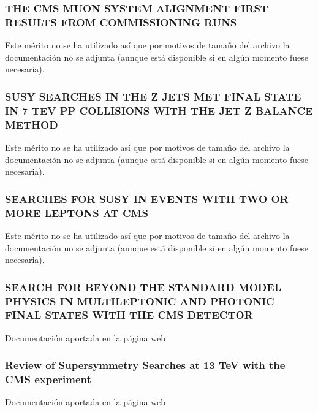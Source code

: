 \documentclass[a4paper, 11pt, twoside, openright]{report}
\begin{document}
\subsubsection{THE CMS MUON SYSTEM ALIGNMENT FIRST RESULTS FROM COMMISSIONING RUNS}
Este mérito no se ha utilizado así que por motivos de tamaño del archivo la documentación no se adjunta (aunque está disponible si en algún momento fuese necesaria).
%

\subsubsection{SUSY SEARCHES IN THE Z JETS MET FINAL STATE IN 7 TEV PP COLLISIONS WITH THE JET Z BALANCE METHOD}
Este mérito no se ha utilizado así que por motivos de tamaño del archivo la documentación no se adjunta (aunque está disponible si en algún momento fuese necesaria).
%

\subsubsection{SEARCHES FOR SUSY IN EVENTS WITH TWO OR MORE LEPTONS AT CMS}
Este mérito no se ha utilizado así que por motivos de tamaño del archivo la documentación no se adjunta (aunque está disponible si en algún momento fuese necesaria).
%

\subsubsection{SEARCH FOR BEYOND THE STANDARD MODEL PHYSICS IN MULTILEPTONIC AND PHOTONIC FINAL STATES WITH THE CMS DETECTOR}
%
Documentación aportada en la página web

\subsubsection{Review of Supersymmetry Searches at 13 TeV with the CMS experiment}
%
Documentación aportada en la página web
\end{document}
